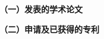 
\begin{publication}
  \noindent\songti\textbf{（一）发表的学术论文}


  \noindent\songti\textbf{（二）申请及已获得的专利}


\end{publication}
